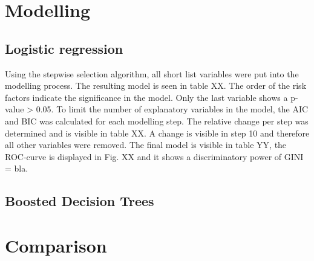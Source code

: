 \section{Modelling}
\subsection{Logistic regression}
Using the stepwise selection algorithm, all short list variables were put into the modelling process. The resulting model is seen in table XX. The order of the risk factors indicate the significance in the model. Only the last variable shows a p-value > 0.05. To limit the number of explanatory variables in the model, the AIC and BIC was calculated for each modelling step. The relative change per step was determined and is visible in table XX. A change is visible in step 10 and therefore all other variables were removed. The final model is visible in table YY, the ROC-curve is displayed in Fig. XX and it shows a discriminatory power of GINI = bla.

\subsection{Boosted Decision Trees}
\section{Comparison}